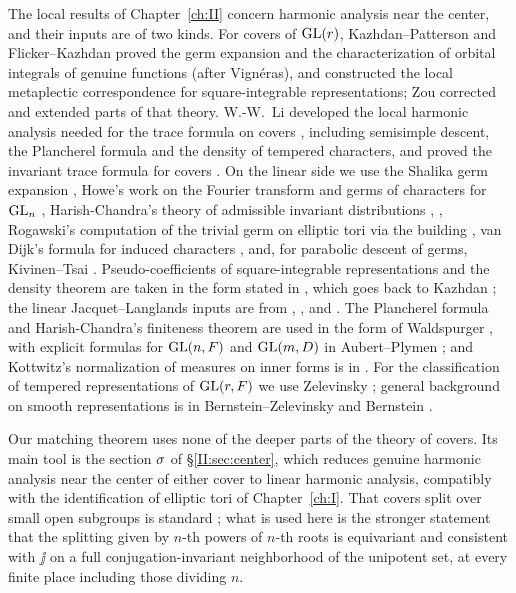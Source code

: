The local results of Chapter~\ref{ch:II} concern harmonic analysis near the center, and their inputs are of two kinds. For covers of $\operatorname{GL}(r)$, Kazhdan--Patterson \cite[\S1]{KP86} and Flicker--Kazhdan \cite[\S8]{FK86} proved the germ expansion and the characterization of orbital integrals of genuine functions (after Vign\'eras), and \cite{FK86} constructed the local metaplectic correspondence for square-integrable representations; Zou \cite{Zo23} corrected and extended parts of that theory. W.-W.~Li developed the local harmonic analysis needed for the trace formula on covers \cite{Li12}, including semisimple descent, the Plancherel formula and the density of tempered characters, and proved the invariant trace formula for covers \cite{Li14}. On the linear side we use the Shalika germ expansion \cite{Sha72}, Howe's work on the Fourier transform and germs of characters for $\operatorname{GL}_n$ \cite{How74}, Harish-Chandra's theory of admissible invariant distributions \cite{HC70}, \cite{HC78}, Rogawski's computation of the trivial germ on elliptic tori via the building \cite{Rog81}, van Dijk's formula for induced characters \cite{vD72}, and, for parabolic descent of germs, Kivinen--Tsai \cite{KT26}. Pseudo-coefficients of square-integrable representations and the density theorem are taken in the form stated in \cite[\S\S25.1, 27.3]{FK86}, which goes back to Kazhdan \cite{Kaz86}; the linear Jacquet--Langlands inputs are from \cite{DKV84}, \cite{Rog83}, \cite{Bad02} and \cite[Theorem~2.2]{Bad08}. The Plancherel formula and Harish-Chandra's finiteness theorem are used in the form of Waldspurger \cite{Wal03}, with explicit formulas for $\operatorname{GL}(n,F)$ and $\operatorname{GL}(m,D)$ in Aubert--Plymen \cite{AP05}; and Kottwitz's normalization of measures on inner forms is in \cite{Kot88}. For the classification of tempered representations of $\operatorname{GL}(r,F)$ we use Zelevinsky \cite{Zel80}; general background on smooth representations is in Bernstein--Zelevinsky \cite{BZ77} and Bernstein \cite{Ber84}.

Our matching theorem uses none of the deeper parts of the theory of covers. Its main tool is the section $\sigma$ of \S\ref{II:sec:center}, which reduces genuine harmonic analysis near the center of either cover to linear harmonic analysis, compatibly with the identification of elliptic tori of Chapter~\ref{ch:I}. That covers split over small open subgroups is standard \cite[\S2]{FK86}; what is used here is the stronger statement that the splitting given by $n$-th powers of $n$-th roots is equivariant and consistent with $\jj$ on a full conjugation-invariant neighborhood of the unipotent set, at every finite place including those dividing $n$.

